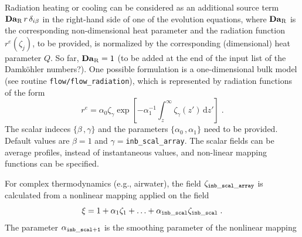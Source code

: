 Radiation heating or cooling can be considered as an additional source term
$\mathrm{\bf Da}_\mathrm{R}\,r\,\delta_{i\beta}$ in the right-hand side of one
of the evolution equations, where $\mathrm{\bf Da}_\mathrm{R}$ is the
corresponding non-dimensional heat parameter and the radiation function
$r^e(\zeta_j)$, to be provided, is normalized by the corresponding (dimensional)
heat parameter $Q$. So far, $\mathrm{\bf Da}_\mathrm{R}=1$ (to be added at the
end of the input list of the Damk{\"o}hler numbers?). One possible formulation
is a one-dimensional bulk model (see routine {\tt flow/flow\_radiation}), which
is represented by radiation functions of the form
\begin{equation}
r^e=\alpha_0 \zeta_{\gamma}\exp\left[
-\alpha_1^{-1}\int_z^\infty\zeta_{\gamma}(z')\,\mathrm{d}z'\right] \;.
\end{equation}
The scalar indeces $\{\beta\,,\gamma\}$ and the parameters $\{\alpha_0\,,\alpha_1\}$ need to be
provided. Default values are $\beta=1$ and $\gamma=${\tt inb\_scal\_array}. The scalar fields can be average profiles,
instead of instantaneous values, and non-linear mapping functions can be
specified.

For complex thermodynamics (e.g., airwater), the field $\zeta_\mathrm{\tt inb\_scal\_array}$ is calculated from a nonlinear mapping applied on the field
\begin{equation}
\xi =1+\alpha_1\zeta_1+\ldots+\alpha_\mathrm{\tt inb\_scal}\zeta_\mathrm{\tt inb\_scal}\;.
\end{equation}
The parameter $\alpha_\mathrm{\tt inb\_scal+1}$ is the smoothing parameter of the nonlinear mapping
